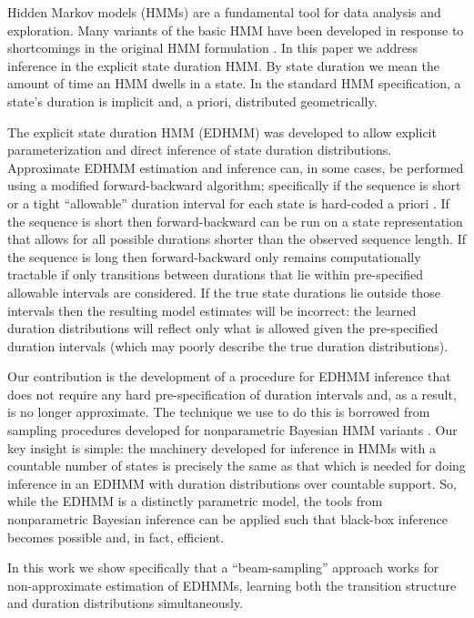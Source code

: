 \label{section}
Hidden Markov models (HMMs) are a fundamental tool for data analysis and exploration.  Many variants of the basic HMM have been developed in response to shortcomings in the original HMM formulation \cite{Rabiner89}.  In this paper we address inference in the explicit state duration HMM.  By state duration we mean the amount of time an HMM dwells in a state.  In the standard HMM specification, a state's duration is implicit and, a priori, distributed geometrically.

The explicit state duration HMM (EDHMM) \cite{Rabiner89} was developed to allow explicit parameterization and direct inference of state duration distributions.  Approximate EDHMM estimation and inference can, in some cases, be performed using a modified forward-backward algorithm; specifically if the sequence is short or a tight ``allowable'' duration interval for each state is hard-coded a priori \cite{Yu2006}.   If the sequence is short then forward-backward can be run on a state representation that allows for all possible durations shorter than the observed sequence length.  If the sequence is long then forward-backward only remains computationally tractable if only transitions between durations that lie within pre-specified allowable intervals are considered.   If the true state durations lie outside those intervals then the resulting model estimates will be incorrect: the learned duration distributions will reflect only what is allowed given the pre-specified duration intervals (which may poorly describe the true duration distributions).

Our contribution is the development of a procedure for EDHMM inference that does not require any hard pre-specification of duration intervals and, as a result, is no longer approximate.  The technique we use to do this 
is borrowed from sampling procedures developed for nonparametric  Bayesian HMM variants \cite{vanGael2008}.  Our key insight is simple: the machinery developed for inference in HMMs with a countable number of states is precisely the same as that which is needed for doing inference in an EDHMM with duration distributions over countable support.  So, while the EDHMM is a distinctly parametric model, the tools from nonparametric Bayesian inference can be applied such that black-box inference becomes possible and, in fact, efficient.

In this work we show specifically that a ``beam-sampling'' approach  \cite{vanGael2008} works for non-approximate estimation of EDHMMs, learning both the transition structure and duration distributions simultaneously.

